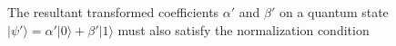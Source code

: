 \documentclass[preview]{standalone}
\begin{document}
\begin{center}
The resultant transformed coefficients $\alpha'$ and $\beta'$ on a quantum state $|\psi'\rangle = \alpha'|0\rangle + \beta'|1\rangle$ must also satisfy the normalization condition
\end{center}
\end{document}
